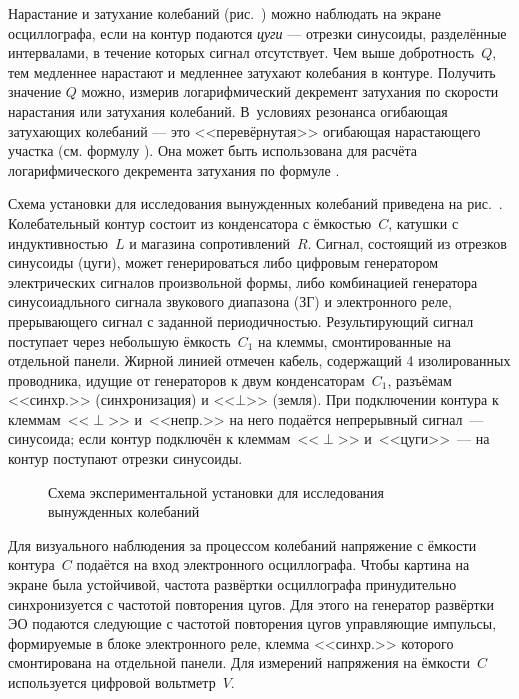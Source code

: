 Нарастание и затухание 
колебаний (рис.~) можно наблюдать 
на экране осциллографа, если на контур подаются \emph{цуги} --- отрезки 
синусоиды, разделённые интервалами, в течение которых сигнал отсутствует. 
Чем выше добротность~$Q$, тем медленнее 
нарастают и медленнее затухают колебания в контуре. Получить значение $Q$ 
можно, измерив логарифмический декремент затухания по скорости 
нарастания или затухания колебаний. В~условиях резонанса огибающая затухающих 
колебаний --- это <<перевёрнутая>> огибающая нарастающего участка 
(см. формулу ).
Она может быть использована для расчёта логарифмического декремента затухания
по формуле .



\experiment 


Схема установки для исследования вынужденных колебаний приведена 
на рис.~. 
Колебательный контур 
состоит из конденсатора с ёмкостью~$C$, катушки с индуктивностью~$L$ и 
магазина сопротивлений~$R$. 
Сигнал, состоящий из отрезков синусоиды (цуги), может генерироваться
либо цифровым генератором электрических сигналов произвольной формы,
либо комбинацией генератора синусоиадльного сигнала звукового 
диапазона (ЗГ) и электронного реле, прерывающего сигнал с заданной периодичностью. 
Результирующий сигнал 
поступает через небольшую ёмкость~$C_1$ на клеммы, 
смонтированные на отдельной панели. 
Жирной линией отмечен кабель, содержащий 4 изолированных проводника, 
идущие от генераторов к двум конденсаторам~$C_1$, 
разъёмам <<синхр.>> (синхронизация) и <<$\bot$>> (земля). При подключении 
контура к клеммам~<<$\perp$>> и~<<непр.>> на него подаётся непрерывный 
сигнал~--- синусоида; если контур подключён к клеммам~<<$\perp$>> и~<<цуги>>~--- 
на контур поступают отрезки синусоиды.


\begin{figure}[h]
    \centering
\small	{}
	\caption{Схема экспериментальной установки для исследования вынужденных
колебаний}
\end{figure}

Для визуального наблюдения за процессом колебаний напряжение с ёмкости 
контура~$C$ подаётся на вход электронного осциллографа. Чтобы картина на 
экране была устойчивой, частота развёртки осциллографа принудительно 
синхронизуется с частотой повторения цугов. Для этого на генератор 
развёртки ЭО подаются следующие с частотой повторения цугов управляющие 
импульсы, формируемые в блоке электронного реле, клемма <<синхр.>> которого 
смонтирована на отдельной панели. Для измерений напряжения на ёмкости~$C$ 
используется цифровой вольтметр~$V$.

